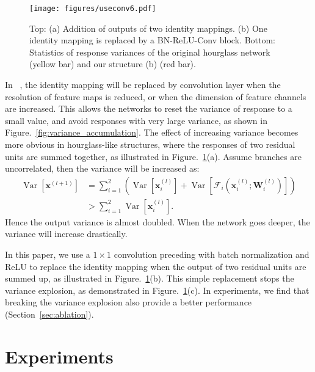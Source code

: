 \documentclass[10pt,twocolumn,letterpaper]{article}
\newcommand{\cF}{\mathcal{F}}
\newcommand{\W}{\mathbf{W}}
\newcommand{\bx}{\mathbf{x}}
\newcommand{\Var}{\operatorname{Var}}
\begin{document}
\begin{figure}[t]
	\begin{center}
		\texttt{[image: figures/useconv6.pdf]}
	\end{center}
		\vspace{-0.3em}
	\caption{ 
	Top: (a) Addition of outputs of two identity mappings. 
	(b) One identity mapping is replaced by a BN-ReLU-Conv block. 
	Bottom: Statistics of response variances of the original hourglass network (yellow bar) and our structure (b) (red bar).
}
	\label{fig:Useconv}
	\vspace{-1em}
\end{figure}

In ~\cite{he2016deep,he2016identity}, the identity mapping will be replaced by convolution layer when the resolution of feature maps is reduced, or when the dimension of feature channels are increased. 
This allows the networks to reset the variance of response to a small value, and avoid responses with very large variance, as shown in Figure.~\ref{fig:variance_accumulation}. 
The effect of increasing variance becomes more obvious in hourglass-like structures, where the responses of two residual units are summed together, as illustrated in Figure.~\ref{fig:Useconv}(a). 
Assume branches are uncorrelated, then the variance will be increased as:
{\small
\begin{align}
\Var\left[\bx^{(l+1)}\right] &= \sum_{i=1}^{2} \left( \Var\left[\bx^{(l)}_i\right] + \Var\left[\cF_i\left(\bx^{(l)}_i; \W^{(l)}_i\right)\right]  \right) \nonumber \\
&> \sum_{i=1}^{2} \Var\left[\bx^{(l)}_i\right].
\end{align}
}
\!\!Hence the output variance is almost doubled. When the network goes deeper, the variance will increase drastically.


In this paper, we use a $1\times 1$ convolution preceding with batch normalization and ReLU to replace the identity mapping when the output of two residual units are summed up, as illustrated in Figure.~\ref{fig:Useconv}(b).  
This simple replacement stops the variance explosion, as demonstrated in Figure.~\ref{fig:Useconv}(c). 
In experiments, we find that breaking the variance explosion also provide a better performance (Section~\ref{sec:ablation}).


\section{Experiments}
\end{document}

